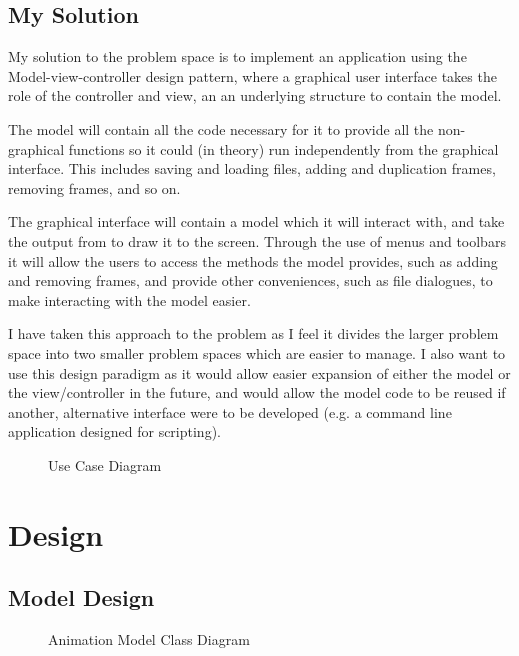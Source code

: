 \documentclass[a4paper, 11pt]{article}
\begin{document}
\subsection{My Solution}

My solution to the problem space is to implement an application using the Model-view-controller design pattern, where a graphical user interface takes the role of the controller and view, an an underlying structure to contain the model.

The model will contain all the code necessary for it to provide all the non-graphical functions so it could (in theory) run independently from the graphical interface. This includes saving and loading files, adding and duplication frames, removing frames, and so on.

The graphical interface will contain a model which it will interact with, and take the output from to draw it to the screen. Through the use of menus and toolbars it will allow the users to access the methods the model provides, such as adding and removing frames, and provide other conveniences, such as file dialogues, to make interacting with the model easier.

I have taken this approach to the problem as I feel it divides the larger problem space into two smaller problem spaces which are easier to manage. I also want to use this design paradigm as it would allow easier expansion of either the model or the view/controller in the future, and would allow the model code to be reused if another, alternative interface were to be developed (e.g. a command line application designed for scripting).

\begin{figure}[H]
\centering
\caption{Use Case Diagram}
\label{UseCaseDiagram}
\end{figure}


\newpage

\section{Design}

\subsection{Model Design}

\begin{figure}[H]
\centering
\caption{Animation Model Class Diagram}
\label{ModelClassDiagram}
\end{figure}
\end{document}
